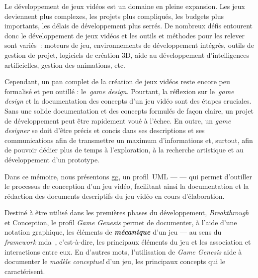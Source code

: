 \begin{introduction}



Le développement de jeux vidéos est un domaine en pleine expansion.
%
Les jeux deviennent plus complexes, les projets plus compliqués, les
budgets plus importants, les d\'elais de développement plus serr\'es.
%
De nombreux défis entourent donc le développement de jeux vidéos et
les outils et méthodes pour les relever sont variés~: moteurs de jeu,
environnements de développement intégrés, outils de gestion de projet,
logiciels de création 3D, aide au développement d'intelligences
artificielles, gestion des animations, etc.

Cependant, un pan complet de la création de jeux vidéos reste encore
peu formalisé et peu outillé : le~\emph{game design}.
%
Pourtant, la réflexion sur le~\emph{game design} et la documentation des concepts d'un jeu vidéo sont des étapes cruciales.
%
Sans une solide documentation et des concepts formul\'es de fa\c{c}on claire, un
projet de développement peut être rapidement voué à l'échec.
%
En outre, un \emph{game designer} se doit d'être précis et concis dans ses
descriptions et ses communications afin de transmettre un maximum
d'informations et, surtout, afin de pouvoir dédier plus de temps à l'exploration, à
la recherche artistique et au développement d'un prototype.


Dans ce mémoire, nous présentons \gls{gg}, un profil~UML ---  --- qui permet d'outiller le processus de conception d'un jeu vidéo, facilitant ainsi la documentation et la rédaction des documents descriptifs du jeu vidéo en cours d'élaboration.

\begin{comment}
\gt{Ci-bas: il vaut mieux ne pas parler <<d'acc\'el\'eration>>, car tu
n'apportes aucune preuve/justification que cela permet d'aller plus
rapidement.}
\end{comment}


%
Destiné à être utilisé dans les premières phases du développement,
\emph{Breakthrough} et Conception, le profil \emph{Game Genesis}
permet de documenter, à l'aide d'une notation graphique, les
\'el\'ements de \emph{\bf mécanique} d'un jeu --- au sens du
\emph{framework} \gls{mda}~\cite{MDA_formal}, c'est-\`a-dire,
les principaux éléments du jeu et les association et interactions
entre eux.
%
En d'autres mots, l'utilisation de \emph{Game Genesis} aide \`a
documenter le \emph{mod\`ele conceptuel} d'un jeu, les principaux
concepts qui le caract\'erisent.



\end{introduction}
